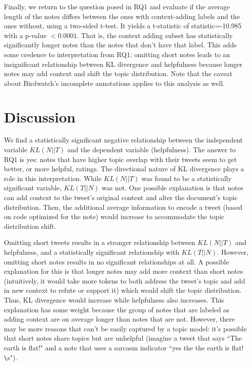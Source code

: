 \documentclass [11pt, proquest] {uwthesis}[2020/02/24]
\begin{document}

Finally,  we return to the question posed in RQ1 and evaluate if the average length of the notes differs between the ones with context-adding  labels and the ones without, using a two-sided t-test. It yields a t-statistic of statistic=-10.985 with a p-value $< 0.0001$. That is, the context adding subset has statistically significantly longer notes than the notes that don’t have that label. This adds some credence to interpretation from RQ1: omitting short notes leads to an insignificant relationship between KL divergence and helpfulness because longer notes may add context and shift the topic distribution. Note that the caveat about Birdwatch's incomplete annotations applies to this analysis as well.

\chapter{Discussion}

We find a statistically significant negative relationship between the independent variable $KL(N || T)$ and the dependent variable (helpfulness). The answer to RQ1 is yes: notes that have higher topic overlap with their tweets seem to get better, or more helpful, ratings. The directional nature of KL divergence plays a role in this interpretation. While $KL(N || T)$ was found to be a statistically significant variable, $KL(T || N)$ was not. One possible explanation is that notes can add context to the tweet’s original content and alter the document’s topic distribution. Then, the additional average information to encode a tweet (based on code optimized for the note) would increase to accommodate the topic distribution shift.

Omitting short tweets results in a stronger relationship between $KL(N || T)$ and helpfulness, and a statistically significant relationship with $KL(T || N)$. However, omitting short notes results in no significant relationships at all. A possible explanation for this is that longer notes may add more context than short notes (intuitively, it would take more tokens to both address the tweet’s topic and add in new context to refute or support it) which would shift the topic distribution. Thus, KL divergence would increase while helpfulness also increases. This explanation has some weight because the group of notes that are labeled as adding context are on average longer than notes that are not. However, there may be more reasons that can’t be easily captured by a topic model: it’s possible that short notes share topics but are unhelpful (imagine a tweet that says ``The earth is flat!" and a note that uses a sarcasm indicator ``yes the the earth is flat! \verb|\|s").
\end{document}
